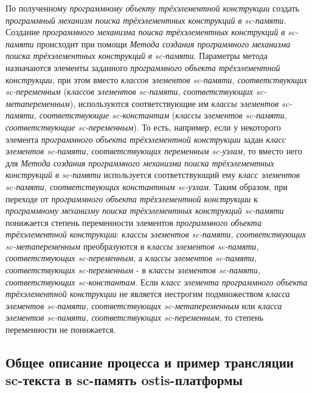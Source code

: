 \begin{textitemize}
	\item По полученному \textit{программному объекту трёхэлементной конструкции} создать \textit{программный механизм поиска трёхэлементных конструкций в sc-памяти}. Создание \textit{программного механизма поиска трёхэлементных конструкций в sc-памяти} происходит при помощи \textit{Метода создания программного механизма поиска трёхэлементных конструкций в sc-памяти}. Параметры метода назначаются элементы заданного \textit{программного объекта трёхэлементной конструкции}, при этом вместо \textit{классов элементов sc-памяти, соответствующих sc-переменным} (\textit{классов элементов sc-памяти, соответствующих sc-метапеременным}), используются соответствующие им \textit{классы элементов sc-памяти, соответствующие sc-константам} (\textit{классы элементов sc-памяти, соответствующие sc-переменным}). То есть, например, если у некоторого элемента \textit{программного объекта трёхэлементной конструкции} задан \textit{класс элементов sc-памяти, соответствующих переменным sc-узлам}, то вместо него для \textit{Метода создания программного механизма поиска трёхэлементных конструкций в sc-памяти} используется соответствующий ему \textit{класс элементов sc-памяти, соответствующих константным sc-узлам}. Таким образом, при переходе от \textit{программного объекта трёхэлементной конструкции} к \textit{программному механизму поиска трёхэлементных конструкций sc-памяти} понижается степень переменности элементов \textit{программного объекта трёхэлементной конструкции}: \textit{классы элементов sc-памяти, соответствующих sc-метапеременным} преобразуются в \textit{классы элементов sc-памяти, соответствующих sc-переменным}, а \textit{классы элементов sc-памяти, соответствующих sc-переменным} - в \textit{классы элементов sc-памяти, соответствующих sc-константам}. Если \textit{класс элемента программного объекта трёхэлементной конструкции} не является нестрогим подмножеством \textit{класса элементов sc-памяти, соответствующих sc-метапеременным} или \textit{класса элементов sc-памяти, соответствующих sc-переменным}, то степень переменности не понижается.
\end{textitemize}

\subsection{Общее описание процесса и пример трансляции sc-текста в sc-память ostis-платформы}
\label{sec_soft_platform_scin_code_example}

